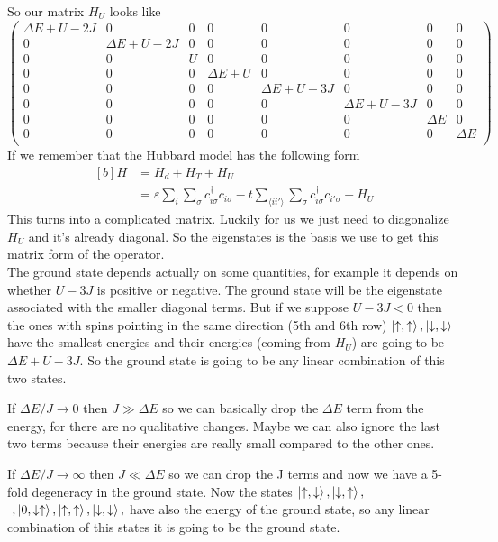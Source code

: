 \begin{questions}
\begin{solution}
So our matrix $H_U$ looks like
\begin{equation}
  \begin{pmatrix}
    \Delta E + U- 2J & 0 & 0 & 0 & 0 & 0 & 0 & 0 \\
    0& \Delta E + U- 2J & 0 & 0 & 0 & 0 & 0 & 0 \\
    0 & 0 & U & 0 & 0 & 0 & 0 & 0 \\
    0 & 0 & 0 & \Delta E + U & 0 & 0 & 0 & 0 \\
    0 & 0 & 0 & 0 & \Delta E+ U - 3J & 0 & 0 & 0 \\
    0 & 0 & 0 & 0&0 & \Delta E+ U - 3J & 0 & 0 \\
    0 & 0 & 0 & 0&0 & 0 & \Delta E & 0 \\
    0 & 0 & 0 & 0&0 & 0 & 0 & \Delta E\\
  \end{pmatrix}
\end{equation}
If we remember that the Hubbard model has the following form
\begin{equation}
  \begin{aligned}[b]
    H &= H_d + H_T + H_U \\
    & = \varepsilon \sum_i \sum_\sigma c_{i\sigma}^\dagger c_{i\sigma} - t \sum_{\langle ii'\rangle } \sum_\sigma c_{i\sigma}^\dagger c_{i'\sigma} + H_U
  \end{aligned}
\end{equation}
This turns into a complicated matrix. Luckily for us we just need to diagonalize $H_U$ and it's already diagonal. So the eigenstates is the basis we use to get this matrix form of the operator.\\

The ground state depends actually on some quantities, for example it depends on whether $ U - 3J $ is positive or negative. The ground state will be the eigenstate associated with the smaller diagonal terms. But if we suppose $U-3J<0$ then the ones with spins pointing in the same direction (5th and 6th row) $\ket{\uparrow, \uparrow}, \ket{\downarrow, \downarrow}$ have the smallest energies and their energies (coming from $H_U$) are going to be $\Delta E+ U - 3J$. So the ground state is going to be any linear combination of this two states.

If $\Delta E/J \rightarrow 0$ then $J\gg \Delta E$ so we can basically drop the $\Delta E$ term from the energy, for there are no qualitative changes. Maybe we can also ignore the last two terms because their energies are really small compared to the other ones.

If $\Delta E/J \rightarrow \infty$ then $J \ll \Delta E$ so we can drop the J terms and now we have a 5-fold degeneracy in the ground state. Now the states
$\ket{\uparrow,\downarrow}, \ket{\downarrow, \uparrow},$ $ \ , \ket{0,\downarrow \uparrow}, \ket{\uparrow, \uparrow}, \ket{\downarrow, \downarrow} ,$ have also the energy of the ground state, so any linear combination of this states it is going to be the ground state.
\end{solution}
\end{questions}
